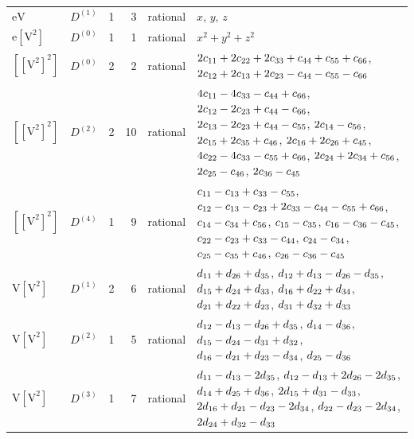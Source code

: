\documentclass[10pt,a4paper]{article}
\numberwithin{equation}{section}
\newcommand{\irrJ}[1]{D^{(#1)}}
\newcommand{\jahn}[1]{\mathrm{#1}}
\newlength{\fillwidth}\newlength{\cellwidth}\newlength{\colwidth}
\newcommand{\signbreak}{\penalty100\relax}
\begin{document}
{\begin{longtable}{@{}llrrl>{\RaggedRight\arraybackslash}p{\fillwidth}@{}}
$\jahn{eV}$ & $\irrJ{1}$ & 1 & 3 & rational & $x$, $y$, $z$\\
$\jahn{e[V^{2}]}$ & $\irrJ{0}$ & 1 & 1 & rational & $x^{2} + y^{2} + z^{2}$\\
$\jahn{[[V^{2}]^{2}]}$ & $\irrJ{0}$ & 2 & 2 & rational & $2c_{11} +\signbreak 2c_{22} +\signbreak 2c_{33} +\signbreak c_{44} +\signbreak c_{55} +\signbreak c_{66}$, $2c_{12} +\signbreak 2c_{13} +\signbreak 2c_{23} -\signbreak c_{44} -\signbreak c_{55} -\signbreak c_{66}$\\
$\jahn{[[V^{2}]^{2}]}$ & $\irrJ{2}$ & 2 & 10 & rational & $4c_{11} -\signbreak 4c_{33} -\signbreak c_{44} +\signbreak c_{66}$, $2c_{12} -\signbreak 2c_{23} +\signbreak c_{44} -\signbreak c_{66}$, $2c_{13} -\signbreak 2c_{23} +\signbreak c_{44} -\signbreak c_{55}$, $2c_{14} -\signbreak c_{56}$, $2c_{15} +\signbreak 2c_{35} +\signbreak c_{46}$, $2c_{16} +\signbreak 2c_{26} +\signbreak c_{45}$, $4c_{22} -\signbreak 4c_{33} -\signbreak c_{55} +\signbreak c_{66}$, $2c_{24} +\signbreak 2c_{34} +\signbreak c_{56}$, $2c_{25} -\signbreak c_{46}$, $2c_{36} -\signbreak c_{45}$\\
$\jahn{[[V^{2}]^{2}]}$ & $\irrJ{4}$ & 1 & 9 & rational & $c_{11} -\signbreak c_{13} +\signbreak c_{33} -\signbreak c_{55}$, $c_{12} -\signbreak c_{13} -\signbreak c_{23} +\signbreak 2c_{33} -\signbreak c_{44} -\signbreak c_{55} +\signbreak c_{66}$, $c_{14} -\signbreak c_{34} +\signbreak c_{56}$, $c_{15} -\signbreak c_{35}$, $c_{16} -\signbreak c_{36} -\signbreak c_{45}$, $c_{22} -\signbreak c_{23} +\signbreak c_{33} -\signbreak c_{44}$, $c_{24} -\signbreak c_{34}$, $c_{25} -\signbreak c_{35} +\signbreak c_{46}$, $c_{26} -\signbreak c_{36} -\signbreak c_{45}$\\
$\jahn{V[V^{2}]}$ & $\irrJ{1}$ & 2 & 6 & rational & $d_{11} +\signbreak d_{26} +\signbreak d_{35}$, $d_{12} +\signbreak d_{13} -\signbreak d_{26} -\signbreak d_{35}$, $d_{15} +\signbreak d_{24} +\signbreak d_{33}$, $d_{16} +\signbreak d_{22} +\signbreak d_{34}$, $d_{21} +\signbreak d_{22} +\signbreak d_{23}$, $d_{31} +\signbreak d_{32} +\signbreak d_{33}$\\
$\jahn{V[V^{2}]}$ & $\irrJ{2}$ & 1 & 5 & rational & $d_{12} -\signbreak d_{13} -\signbreak d_{26} +\signbreak d_{35}$, $d_{14} -\signbreak d_{36}$, $d_{15} -\signbreak d_{24} -\signbreak d_{31} +\signbreak d_{32}$, $d_{16} -\signbreak d_{21} +\signbreak d_{23} -\signbreak d_{34}$, $d_{25} -\signbreak d_{36}$\\
$\jahn{V[V^{2}]}$ & $\irrJ{3}$ & 1 & 7 & rational & $d_{11} -\signbreak d_{13} -\signbreak 2d_{35}$, $d_{12} -\signbreak d_{13} +\signbreak 2d_{26} -\signbreak 2d_{35}$, $d_{14} +\signbreak d_{25} +\signbreak d_{36}$, $2d_{15} +\signbreak d_{31} -\signbreak d_{33}$, $2d_{16} +\signbreak d_{21} -\signbreak d_{23} -\signbreak 2d_{34}$, $d_{22} -\signbreak d_{23} -\signbreak 2d_{34}$, $2d_{24} +\signbreak d_{32} -\signbreak d_{33}$\\

\end{longtable}}
\end{document}
